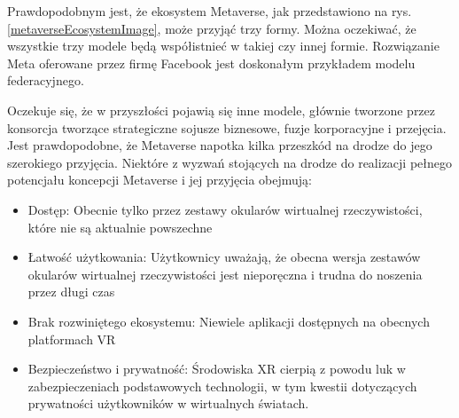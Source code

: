 Prawdopodobnym jest, że ekosystem Metaverse, jak przedstawiono na rys.\ref{metaverseEcosystemImage}, może przyjąć trzy formy. Można oczekiwać, że wszystkie trzy modele będą współistnieć w takiej czy innej formie. Rozwiązanie Meta oferowane przez firmę Facebook jest doskonałym przykładem modelu federacyjnego\cite{metaverseSecurityIssuesChallengesAndViableZTAModel}. 

Oczekuje się, że w przyszłości pojawią się inne modele, głównie tworzone przez konsorcja tworzące strategiczne sojusze biznesowe, fuzje korporacyjne i przejęcia. Jest prawdopodobne, że Metaverse napotka kilka przeszkód na drodze do jego szerokiego przyjęcia. Niektóre z wyzwań stojących na drodze do realizacji pełnego potencjału koncepcji Metaverse i jej przyjęcia obejmują:

\begin{itemize}
    \item Dostęp: Obecnie tylko przez zestawy okularów wirtualnej rzeczywistości, które nie są aktualnie powszechne
    \item Łatwość użytkowania: Użytkownicy uważają, że obecna wersja zestawów okularów wirtualnej rzeczywistości jest nieporęczna i trudna do noszenia przez długi czas
    \item Brak rozwiniętego ekosystemu: Niewiele aplikacji dostępnych na obecnych platformach VR
    \item Bezpieczeństwo i prywatność: Środowiska XR cierpią z powodu luk w zabezpieczeniach podstawowych technologii, w tym kwestii dotyczących prywatności użytkowników w wirtualnych światach. 
\end{itemize}